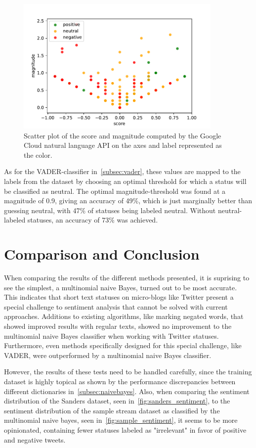\begin{figure}
    \centering
    \caption{Scatter plot of the score and magnitude computed by the Google Cloud natural language API on the axes and label represented as the color.}
    \label{fig:gcloud}
    \includegraphics[width=10cm]{../figures/gcloud.pdf}
\end{figure}

As for the VADER-classifier in~\ref{subsec:vader}, these values are mapped to the labels from the dataset by
choosing an optimal threshold for which a status will be classified as neutral.
The optimal magnitude-threshold was found at a magnitude of 0.9, giving an accuracy of 49\%,
which is just marginally better than guessing neutral, with 47\% of statuses being labeled neutral.
Without neutral-labeled statuses, an accuracy of 73\% was achieved.

\section{Comparison and Conclusion}
\label{sec:comparison}

When comparing the results of the different methods presented, it is suprising to see the simplest,
a multinomial naive Bayes, turned out to be most accurate.\\
This indicates that short text statuses on micro-blogs like Twitter present a special challenge to sentiment analysis
that cannot be solved with current approaches.
Additions to existing algorithms, like marking negated words, that showed improved results with regular texts,
showed no improvement to the multinomial naive Bayes classifier when working with Twitter statuses.
Furthermore, even methods specifically designed for this special challenge, like VADER,
were outperformed by a multinomial naive Bayes classifier.
\par
However, the results of these tests need to be handled carefully,
since the training dataset is highly topical as shown by the performance discrepancies between different dictionaries in~\ref{subsec:naivebayes}.
Also, when comparing the sentiment distribution of the Sanders dataset, seen in~\ref{fig:sanders_sentiment},
to the sentiment distribution of the sample stream dataset as classified by the multinomial naive bayes, seen in~\ref{fig:sample_sentiment},
it seems to be more opinionated, containing fewer statuses labeled as "irrelevant" in favor of positive and negative tweets.


